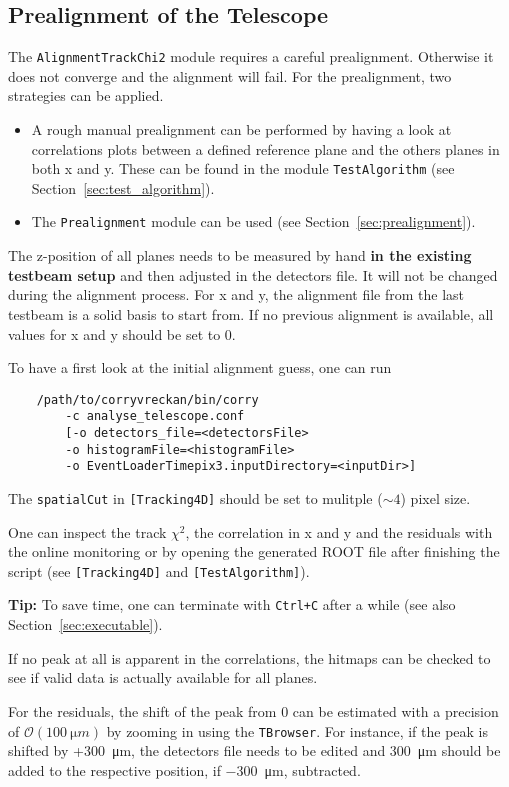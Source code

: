 \subsection*{Prealignment of the Telescope}
The \texttt{AlignmentTrackChi2} module requires a careful prealignment. Otherwise it does not converge and the alignment will fail.
For the prealignment, two strategies can be applied.
\begin{itemize}
\item A rough manual prealignment can be performed by having a look at correlations plots between a defined reference plane and the others planes in both x and y.
These can be found in the module \texttt{TestAlgorithm} (see Section~\ref{sec:test_algorithm}).
\item The \texttt{Prealignment} module can be used (see Section~\ref{sec:prealignment}).
\end{itemize}

The z-position of all planes needs to be measured by hand \textbf{in the existing testbeam setup} and then adjusted in the detectors file. 
It will not be changed during the alignment process.
For x and y, the alignment file from the last testbeam is a solid basis to start from.
If no previous alignment is available, all values for x and y should be set to 0.

To have a first look at the initial alignment guess, one can run
\begin{verbatim}
    /path/to/corryvreckan/bin/corry 
        -c analyse_telescope.conf
    	[-o detectors_file=<detectorsFile> 
    	-o histogramFile=<histogramFile> 
    	-o EventLoaderTimepix3.inputDirectory=<inputDir>]
\end{verbatim}

The \texttt{spatialCut} in \texttt{[Tracking4D]} should be set to mulitple ($\sim4$) pixel size.

One can inspect the track $\chi^2$, the correlation in x and y and the residuals with the online monitoring or by opening the generated ROOT file after finishing the script (see \texttt{[Tracking4D]} and \texttt{[TestAlgorithm]}).

\textbf{Tip:} To save time, one can terminate \corry with \texttt{Ctrl+C} after a while (see also Section~\ref{sec:executable}).

If no peak at all is apparent in the correlations, the hitmaps can be checked to see if valid data is actually available for all planes.

For the residuals, the shift of the peak from 0 can be estimated with a precision of $\mathcal{O}(\SI{100}{\micro m})$ by zooming in using the \texttt{TBrowser}.
For instance, if the peak is shifted by +\SI{+300}{\micro m}, the detectors file needs to be edited and \SI{+300}{\micro m} should be added to the respective position, if \SI{-300}{\micro m}, subtracted.


